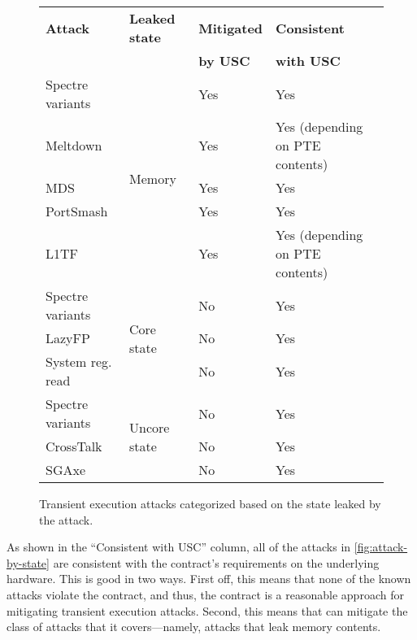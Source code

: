 \begin{figure}
\small
\centering
\begin{tabular}{@{}llll@{}}
\textbf{Attack} & \textbf{Leaked state} & \textbf{Mitigated} & \textbf{Consistent} \\
&& \textbf{by USC} & \textbf{with USC} \\
\midrule

Spectre variants & \multirow{5}{0.75in}{Memory} & Yes & Yes\\
Meltdown & & Yes & Yes (depending on PTE contents)\\
MDS & & Yes & Yes\\
PortSmash & & Yes & Yes\\
L1TF & & Yes & Yes (depending on PTE contents)\\

\midrule

Spectre variants & \multirow{3}{0.75in}{Core state} & No & Yes \\
LazyFP & & No & Yes \\
System reg. read & & No & Yes \\

\midrule

Spectre variants & \multirow{3}{0.75in}{Uncore state} & No & Yes \\
CrossTalk & & No & Yes \\
SGAxe & & No & Yes \\

\end{tabular}
\caption{Transient execution attacks categorized based on the
  state leaked by the attack.}
\label{fig:attack-by-state}
\end{figure}

As shown in the ``Consistent with USC'' column, all of the attacks
in \autoref{fig:attack-by-state} are consistent with the contract's
requirements on the underlying hardware.  This is good in two ways.
First off, this means that none of the known attacks violate the contract,
and thus, the contract is a reasonable approach for mitigating transient
execution attacks.  Second, this means that \contract can mitigate
the class of attacks that it covers---namely, attacks that leak memory
contents.

